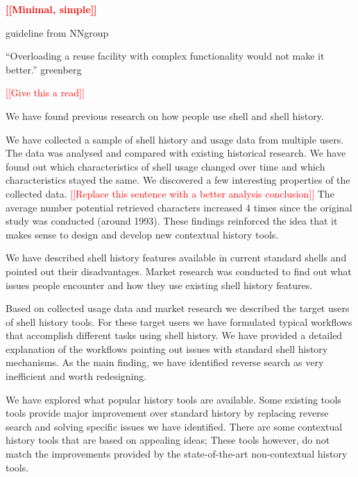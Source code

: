 \documentclass[thesis=M,english]{FITthesis}[2012/10/20]
\newcommand{\todotext}[1]{\textcolor{red}{\textbf{[[#1]]}}}
\newcommand{\redtext}[1]{\textcolor{red}{[[#1]]}}
\begin{document}
\todotext{Minimal, simple}

guideline from NNgroup

“Overloading a reuse facility with complex functionality would not make it better.” greenberg








\begin{conclusion}

\redtext{Give this a read}

We have found previous research on how people use shell and shell history.  

We have collected a sample of shell history and usage data from multiple users. The data was analysed and compared with existing historical research.
We have found out which characteristics of shell usage changed over time and which characteristics stayed the same. We discovered a few interesting properties of the collected data. \redtext{Replace this sentence with a better analysis conclusion} 
The average number potential retrieved characters increased 4 times since the original study was conducted (around 1993). These findings reinforced the idea that it makes sense to design and develop new contextual history tools. 

We have described shell history features available in current standard shells and pointed out their disadvantages. Market research was conducted to find out what issues people encounter and how they use existing shell history features. 

Based on collected usage data and market research we described the target users of shell history tools. For these target users we have formulated typical workflows that accomplish different tasks using shell history. We have provided a detailed explanation of the workflows pointing out issues with standard shell history mechanisms. As the main finding, we have identified reverse search as very inefficient and worth redesigning.

We have explored what popular history tools are available. Some existing tools tools provide major improvement over standard history by replacing reverse search and solving specific issues we have identified. There are some contextual history tools that are based on appealing ideas; These tools however, do not match the improvements provided by the state-of-the-art non-contextual history tools. 
 

\end{conclusion}
\end{document}
